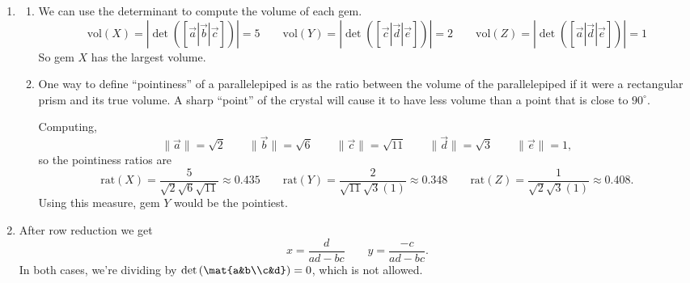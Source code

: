 		\begin{enumerate}
			\item
				\begin{enumerate}
					\item
				We can use the determinant to compute the volume of each gem.
				\[
					\text{vol}(X) = |\det([\vec a|\vec b|\vec c])| = 5\qquad
					\text{vol}(Y) = |\det([\vec c|\vec d|\vec e])| = 2\qquad
					\text{vol}(Z) = |\det([\vec a|\vec d|\vec e])| = 1
				\]
			So gem $X$ has the largest volume.
					\item One way to define ``pointiness'' of a parallelepiped
						is as the ratio between the volume of the parallelepiped if
						it were a rectangular prism and its true volume. A sharp ``point''
						of the crystal will cause it to have less volume than a point that is close
						to $90^\circ$.

						Computing,
						\[
							\|\vec a\|=\sqrt{2}\qquad
							\|\vec b\|=\sqrt{6}\qquad
							\|\vec c\|=\sqrt{11}\qquad
							\|\vec d\|=\sqrt{3}\qquad
							\|\vec e\|=1,
						\]
						so the pointiness ratios are
						\[
							\text{rat}(X)=\frac{5}{\sqrt{2}\sqrt{6}\sqrt{11}}\approx 0.435\qquad
							\text{rat}(Y)=\frac{2}{\sqrt{11}\sqrt{3}(1)}\approx 0.348\qquad
							\text{rat}(Z)=\frac{1}{\sqrt{2}\sqrt{3}(1)}\approx 0.408.
						\]
						Using this measure, gem $Y$ would be the pointiest.
				\end{enumerate}
			\item After row reduction we get
				\[
					x=\frac{d}{ad-bc}\qquad y=\frac{-c}{ad-bc}.
				\]
				In both cases, we're dividing by $\det\left(\mat{a&b\\c&d}\right)=0$, which is not allowed.


\end{enumerate}
